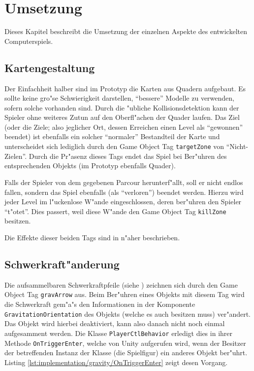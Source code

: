 \section{Umsetzung}
\label{sec:implementation}
%
Dieses Kapitel beschreibt die Umsetzung der einzelnen Aspekte des
entwickelten Computerspiels.
%
\subsection{Kartengestaltung}
\label{sec:implementation/maps}
%
Der Einfachheit halber sind im Prototyp die Karten aus Quadern aufgebaut.
Es sollte keine gro"se Schwierigkeit darstellen, ``bessere'' Modelle
zu verwenden, sofern solche vorhanden sind. Durch die "ubliche Kollisionsdetektion
kann der Spieler ohne weiteres Zutun auf den Oberfl"achen der Quader laufen.
Das Ziel (oder die Ziele; also jeglicher Ort, dessen Erreichen einen Level als
``gewonnen'' beendet) ist ebenfalls ein solcher ``normaler'' Bestandteil der Karte
und unterscheidet sich lediglich durch den Game Object Tag \texttt{targetZone}
von ``Nicht-Zielen''. Durch die Pr"asenz dieses Tags endet das Spiel bei
Ber"uhren des entsprechenden Objekts (im Prototyp ebenfalls Quader).

Falls der Spieler von dem gegebenen Parcour herunterf"allt, soll er nicht
endlos fallen, sondern das Spiel ebenfalls (als ``verloren'') beendet
werden. Hierzu wird jeder Level im l"uckenlose W"ande eingeschlossen,
deren ber"uhren den Spieler ``t"otet''. Dies passert, weil diese W"ande
den Game Object Tag \texttt{killZone} besitzen.

Die Effekte dieser beiden Tags sind in 
n"aher beschrieben.
%
\subsection{Schwerkraft"anderung}
\label{sec:implementation/gravity}
%
Die aufsammelbaren Schwerkraftpfeile (siehe )
zeichnen sich durch den Game Object Tag \texttt{gravArrow} aus. Beim Ber"uhren
eines Objekts mit diesem Tag wird die Schwerkraft gem"a"s den Informationen in
der Komponente \texttt{GravitationOrientation} des Objekts (welche es auch
besitzen muss) ver"andert. Das Objekt wird hierbei deaktiviert, kann also danach
nicht noch einmal aufgesamment werden. Die Klasse \texttt{PlayerCtlBehavior}
erledigt dies in ihrer Methode \texttt{OnTriggerEnter}, welche von Unity
aufgerufen wird, wenn der Besitzer der betreffenden Instanz der Klasse (die
Spielfigur) ein anderes Objekt ber"uhrt. Listing
\ref{lst:implementation/gravity/OnTriggerEnter} zeigt desen Vorgang.

